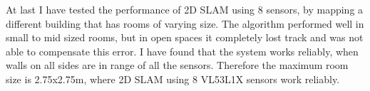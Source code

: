 At last I have tested the performance of 2D SLAM using 8 sensors, by mapping a different building 
that has rooms of varying size. The algorithm performed well in small to mid sized rooms, but in open
spaces it completely lost track and was not able to compensate this error. I have found that the system
works reliably, when walls on all sides are in range of all the sensors. Therefore the maximum room size
is 2.75x2.75m, where 2D SLAM using 8 VL53L1X sensors work reliably.







